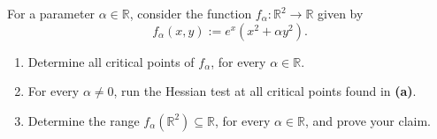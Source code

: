 \begin{exercise}[Critical points and Hessian test for $f_\alpha(x,y) = e^x(x^2 + \alpha y^2)$]
\label{ex:hessian_parameterized_exp}
For a parameter $\alpha \in \mathbb{R}$, consider the function $f_\alpha : \mathbb{R}^2 \to \mathbb{R}$ given by
\[f_\alpha(x,y) := e^x(x^2 + \alpha y^2).\]
\begin{enumerate}[label=\textbf{(\alph*)}]
  \item Determine all critical points of $f_\alpha$, for every $\alpha \in \mathbb{R}$.
  \item For every $\alpha \neq 0$, run the Hessian test at all critical points found in \textbf{(a)}.
  \item Determine the range $f_\alpha(\mathbb{R}^2) \subseteq \mathbb{R}$, for every $\alpha \in \mathbb{R}$, and prove your claim.
\end{enumerate}
\end{exercise}

